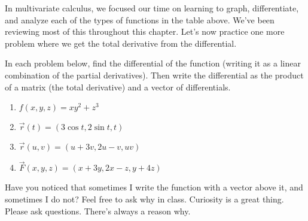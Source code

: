 In multivariate calculus, we focused our time on learning to graph, differentiate, and analyze each of the types of functions in the table above. We've been reviewing most of this throughout this chapter.  Let's now practice one more problem where we get the total derivative from the differential.




\begin{problem}%
In each problem below, find the differential of the function (writing it as a linear combination of the partial derivatives). Then write the differential as the product of a matrix (the total derivative) and a vector of differentials.   
\begin{enumerate}
 \item $f(x,y,z) = xy^2+z^3$
 \item $\vec r(t) = (3\cos t,2\sin t, t)$
 \item $\vec r(u,v) = (u+3v, 2u-v, uv)$
 \item $\vec F(x,y,z) = (x+3y,2x-z,y+4z)$
\end{enumerate}
\end{problem}






Have you noticed that sometimes I write the function with a vector above it, and sometimes I do not? Feel free to ask why in class.  Curiosity is a great thing.  Please ask questions. There's always a reason why.




\subsection*{\ideaB}





